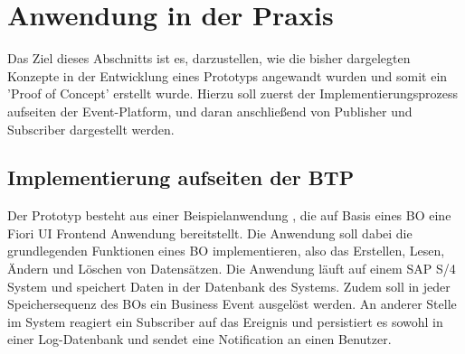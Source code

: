 \section{Anwendung in der Praxis}

\label{implementierung}
  Das Ziel dieses Abschnitts ist es, darzustellen, wie die bisher dargelegten Konzepte in der Entwicklung eines Prototyps angewandt wurden und somit ein 'Proof of Concept' erstellt wurde. Hierzu soll zuerst der Implementierungsprozess aufseiten der Event-Platform, und daran anschließend von Publisher und Subscriber dargestellt werden.

  \subsection{Implementierung aufseiten der BTP}

  Der Prototyp besteht aus einer Beispielanwendung , die auf Basis eines \ac{BO} eine Fiori UI Frontend Anwendung bereitstellt. Die Anwendung soll dabei die grundlegenden Funktionen eines \ac{BO} implementieren, also das Erstellen, Lesen, Ändern und Löschen von Datensätzen. Die Anwendung läuft auf einem SAP S/4 System und speichert Daten in der Datenbank des Systems. Zudem soll in jeder Speichersequenz des \ac{BO}s ein Business Event ausgelöst werden. An anderer Stelle im System reagiert ein Subscriber auf das Ereignis und persistiert es sowohl in einer Log-Datenbank und sendet eine Notification an einen Benutzer. \\

